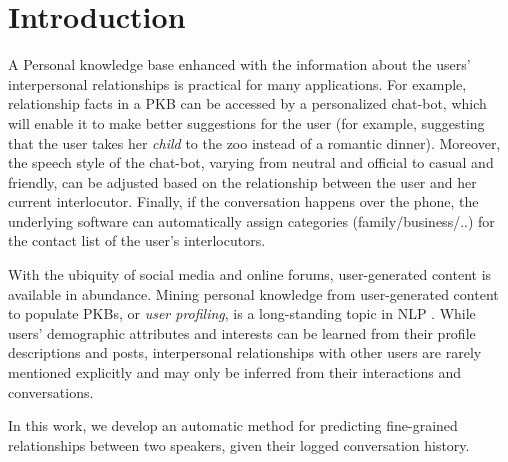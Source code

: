 \section{Introduction}

 A Personal knowledge base enhanced with the information about the users' interpersonal relationships is practical for many applications. For example, relationship facts in a PKB can be accessed by a personalized chat-bot, which will enable it to make better suggestions for the user (for example, suggesting that the user takes her \textit{child} to the zoo instead of a romantic dinner). Moreover, the speech style of the chat-bot, varying from neutral and official to casual and friendly, can be adjusted based on the relationship between the user and her current interlocutor. Finally, if the conversation happens over the phone, the underlying software can automatically assign categories (family/business/..) for the contact list of the user's interlocutors.

With the ubiquity of social media and online forums, user-generated content is available in abundance. Mining personal knowledge from user-generated content to populate PKBs, or \emph{user profiling}, is a long-standing topic in NLP \cite[e.g.,][]{flekova:ACL16:long,basile:2017,tigunova2019listening}. While users' demographic attributes and interests can be learned from their profile descriptions and posts, interpersonal relationships with other users are rarely mentioned explicitly and may only be inferred from their interactions and conversations.

In this work, we develop an automatic method for predicting fine-grained relationships between two speakers, given their logged conversation history.

